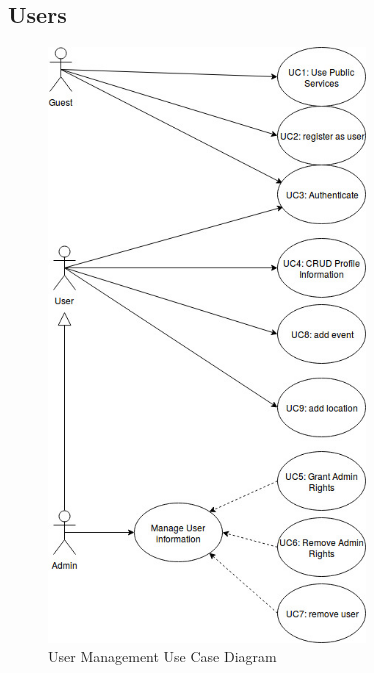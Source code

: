\documentclass[11pt]{article}
\begin{document}
	\subsection{Users}
	\begin{figure}[!h]
        \centering
        \includegraphics[width=0.75\textwidth]{Diagrams/UserManagement/UserUseCaseDiagram}
        \caption{User Management Use Case Diagram}
        \label{fig:user_use_case}
    \end{figure}
	
\end{document}
